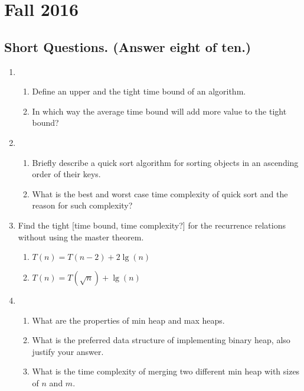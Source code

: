 \section{Fall 2016}

\subsection{Short Questions.  (Answer eight of ten.)}

\begin{enumerate}
	\item \begin{enumerate}
		\item Define an upper and the tight time bound of an algorithm.
		\item In which way the average time bound will add more value to the tight bound?
	\end{enumerate}
	

	\item\begin{enumerate}
		\item Briefly describe a quick sort algorithm for sorting objects in an ascending order of their keys.
		\item What is the best and worst case time complexity of quick sort and the reason for such complexity?
	\end{enumerate}
	
	
	\item Find the tight [time bound, time complexity?] for the recurrence relations without using the master theorem. 
	\begin{enumerate}
		\item $T(n) = T(n-2) + 2 \lg(n)$
		\item $T(n) = T(\sqrt{n}) + \lg(n)$
	\end{enumerate}
	
	
	\item \begin{enumerate}
		\item What are the properties of min heap and max heaps.
		\item What is the preferred data structure of implementing binary heap, also justify your answer.
		\item What is the time complexity of merging two different min heap with sizes of $n$ and $m$.
	\end{enumerate}
	

\end{enumerate}
